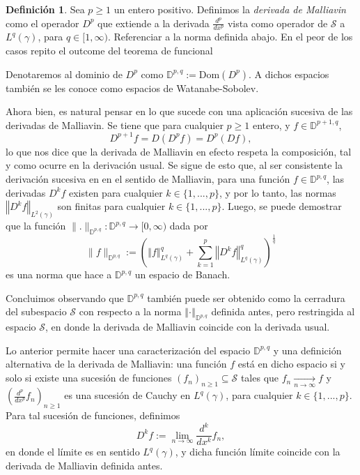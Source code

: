 \documentclass[letterpaper,twoside,12pt]{book}
\newcommand{\D}{\mathbb{D}}
\renewcommand{\S}{\mathcal{S}}
\newcommand{\1}{\mathds{1}}
\renewcommand{\to}{\rightarrow}
\newcommand{\norm}[1]{\left\Vert #1 \right\Vert}
\theoremstyle{definition}
\newtheorem{dfn}{Definición}
\theoremstyle{definition}
\theoremstyle{remark}
\theoremstyle{definition}
\theoremstyle{definition}
\theoremstyle{definition}
\theoremstyle{definition}
\theoremstyle{definition}
\begin{document}
\begin{dfn}
   Sea $p\geq1$ un entero positivo. Definimos la \textit{derivada de Malliavin} como el operador $D^{p}$ que extiende a la derivada $\frac{d^{p}}{dx^{p}}$ vista como operador de $\S$ a $L^{q}(\gamma)$, para $q\in [1,\infty)$. {\color{red} Referenciar a la norma definida abajo. En el peor de los casos repito el outcome del teorema de funcional}
\end{dfn}

Denotaremos al dominio de $D^{p}$ como $\D^{p,q}:=\text{Dom}(D^{p})$. A dichos espacios también se les conoce como espacios de Watanabe-Sobolev. 

Ahora bien, es natural pensar en lo que sucede con una aplicación sucesiva de las derivadas de Malliavin. Se tiene que para cualquier $p\geq1$ entero, y $f\in \D^{p+1,q}$, 
\[
   D^{p+1}f=D(D^{p}f)=D^{p}(Df),
\]
lo que nos dice que la derivada de Malliavin en efecto respeta la composición, tal y como ocurre en la derivación usual. Se sigue de esto que, al ser consistente la derivación sucesiva en en el sentido de Malliavin, para una función $f\in \D^{p,q}$, las derivadas $D^{k}f$ existen para cualquier $k\in \{1,...,p\}$, y por lo tanto, las normas $\norm{D^kf}_{L^2(\gamma)}$ son finitas para cualquier $k\in \{1,...,p\}$. Luego, se puede demostrar que la función $\|.\|_{\mathbb{D}^{p,q}}:\D^{p,q}\longrightarrow[0,\infty)$ dada por
\[
   \|f\|_{\D^{p,q}}:=\left(\norm{f}_{L^{q}(\gamma)}^q+\sum_{k=1}^p\norm{D^{k}f}_{L^{q}(\gamma)}^{q}\right)^{\frac{1}{q}}
\] 
es una norma que hace a $\D^{p,q}$ un espacio de Banach.

Concluimos observando que $\D^{p,q}$ también puede ser obtenido como la cerradura del subespacio $\S$ con respecto a la norma $\norm{\cdot}_{\D^{p,q}}$ definida antes, pero restringida al espacio $\S$, en donde la derivada de Malliavin coincide con la derivada usual.

Lo anterior permite hacer una caracterización del espacio $\D^{p,q}$ y una definición alternativa de la derivada de Malliavin: una función $f$ está en dicho espacio si y solo si existe una sucesión de funciones $(f_n)_{n\geq1}\subseteq \S$ tales que $f_n\xrightarrow[n\to\infty]{}f$ y $(\frac{d^{p}}{dx^{p}}f_n)_{n\geq1}$ es una sucesión de Cauchy en $L^q(\gamma)$, para cualquier $k\in \{1,...,p\}$. Para tal sucesión de funciones, definimos 
\[
D^{k}f:=\lim_{n\to \infty}\frac{d^k}{dx^{k}}f_n,
\]
en donde el límite es en sentido $L^{q}(\gamma)$, y dicha función límite coincide con la derivada de Malliavin definida antes.
\end{document}

